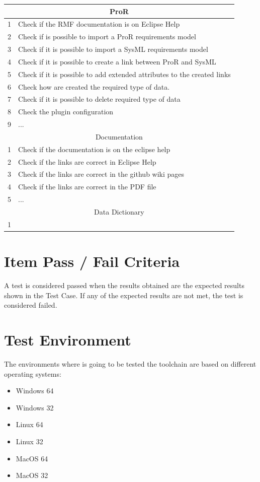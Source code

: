 \begin{center}
\begin{longtable}[H]{|p{2cm}|p{8cm}|}\hline
\multicolumn{2}{|c|}{ProR}\\\hline
1 & Check if the RMF documentation is on Eclipse Help\\\hline
2 & Check if is possible to import a ProR requirements model\\\hline
3 & Check if it is possible to import a SysML requirements model\\\hline
4 & Check if it is possible to create a link between ProR and SysML\\\hline
5 & Check if it is possible to add extended attributes to the created links\\\hline
6 & Check how are created the required type of data.\\\hline
7 & Check if it is possible to delete required type of data\\\hline
8 & Check the plugin configuration\\ \hline
9 & ... \\ \hline
\multicolumn{2}{|c|}{Documentation}\\\hline
1 & Check if the documentation is on the eclipse help\\\hline
2 & Check if the links are correct in Eclipse Help\\\hline
3 & Check if the links are correct in the github wiki pages\\\hline
4 & Check if the links are correct in the PDF file\\\hline
5 & ...\\ \hline
\multicolumn{2}{|c|}{Data Dictionary}\\\hline
1 & \\ \hline
\end{longtable}
\end{center}


\section{Item Pass / Fail Criteria}
A test is considered passed when the results obtained are the expected results shown in the Test Case. If any of the expected results are not met, the test is considered failed.

\section{Test Environment}
The environments where is going to be tested the toolchain are based on different operating systems:
\begin{itemize}
\item Windows 64
\item Windows 32
\item Linux 64
\item Linux 32
\item MacOS 64
\item MacOS 32
\end{itemize}

